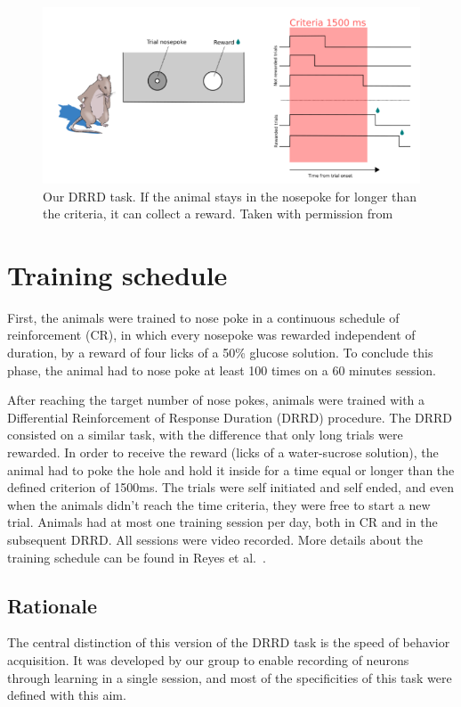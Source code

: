     \begin{figure}
        \centering
        \includegraphics[width=\textwidth]{figures/tarefa_eli.png}
        \caption[Our DRRD task]{Our DRRD task. If the animal stays in the nosepoke for longer than the criteria, it can collect a reward. Taken with permission from \cite{Eliezyer2018}}
        \label{fig:task}
    \end{figure}

\section{Training schedule}
    First, the animals were trained to nose poke in a continuous schedule of reinforcement (CR), in which every nosepoke was rewarded independent of duration, by a reward of four licks of a 50\% glucose solution. To conclude this phase, the animal had to nose poke at least 100 times on a 60 minutes session. 
    
    After reaching the target number of nose pokes, animals were trained with a Differential Reinforcement of Response Duration (DRRD) procedure. The DRRD consisted on a similar task, with the difference that only long trials were rewarded. In order to receive the reward (licks of a water-sucrose solution), the animal had to poke the hole and hold it inside for a time equal or longer than the defined criterion of 1500ms. The trials were self initiated and self ended, and even when the animals didn't reach the time criteria, they were free to start a new trial. Animals had at most one training session per day, both in CR and in the subsequent DRRD. All sessions were video recorded. More details about the training schedule can be found in Reyes et al.~\cite{ReyesDRRD}.

    \subsection{Rationale}
        The central distinction of this version of the DRRD task is the speed of behavior acquisition. It was developed by our group to enable recording of neurons through learning in a single session, and most of the specificities of this task were defined with this aim.
        
